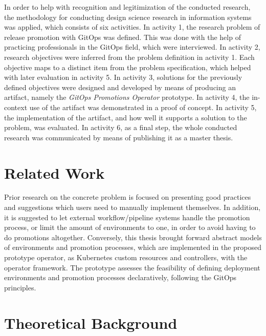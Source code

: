 In order to help with recognition and legitimization of the conducted research,
the methodology for conducting design science research in information systems
\autocite{designScienceResearchMethodologyForInformationSystemsResearch}
was applied, which consists of six activities.
In activity 1,
the research problem of
release promotion with GitOps
was defined.
This was done with the help of practicing professionals in the GitOps field,
which were interviewed.
In activity 2,
research objectives were inferred from the problem definition in activity 1.
Each objective maps to a distinct item from the problem specification,
which helped with later evaluation in activity 5.
In activity 3,
solutions for the previously defined objectives were designed and developed
by means of producing an artifact, namely the \textit{GitOps Promotions Operator} prototype.
In activity 4,
the in-context use of the artifact was demonstrated in a proof of concept.
In activity 5,
the implementation of the artifact,
and how well it supports a solution to the problem,
was evaluated.
In activity 6, as a final step,
the whole conducted research was communicated by means of
publishing it as a master thesis.

\section*{Related Work}

Prior research on the concrete problem is focused on presenting
good practices and suggestions
which users need to manually implement themselves.
In addition, it is suggested to let external workflow/pipeline systems handle the promotion process,
or limit the amount of environments to one, in order to avoid having to do promotions altogether.
Conversely, this thesis brought forward
abstract models of environments and promotion processes,
which are implemented in the proposed prototype operator,
as Kubernetes custom resources and controllers, with the operator framework.
The prototype assesses the feasibility of
defining deployment environments and promotion processes declaratively,
following the GitOps principles.

\section*{Theoretical Background}

